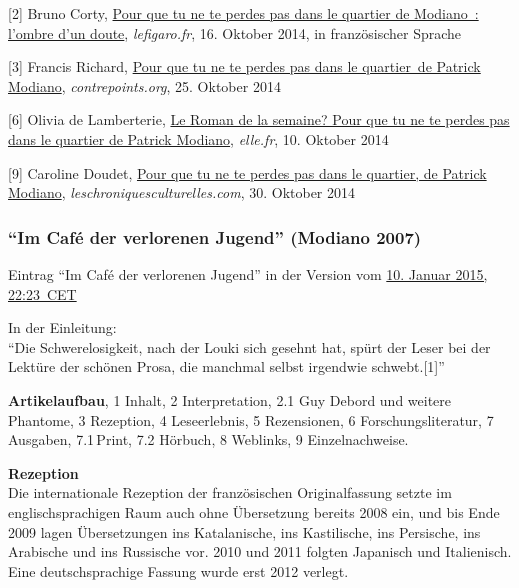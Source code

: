 \documentclass[fontsize=12pt]{scrartcl}
\begin{document}
{\tiny[2] Bruno Corty, \href{http://www.lefigaro.fr/livres/2014/10/16/03005-20141016ARTFIG00019--pour-que-tu-ne-te-perdes-pas-dans-le-quartier-de-modiano-l-ombre-d-un-doute.php}{Pour que tu ne te perdes pas dans le quartier de Modiano : l'ombre d'un doute}, \textit{lefigaro.fr}, 16. Oktober 2014, in franz\"osischer Sprache\par}
{\tiny[3] Francis Richard, \href{http://www.contrepoints.org/2014/10/25/185863-pour-que-tu-ne-te-perdes-pas-dans-le-quartier-de-patrick-modiano}{\flq Pour que tu ne te perdes pas dans le quartier\frq\, de Patrick Modiano}, \textit{contrepoints.org}, 25. Oktober 2014\par}
{\tiny[6] Olivia de Lamberterie, \href{http://www.elle.fr/Loisirs/Livres/News/Le-roman-de-la-semaine-Pour-que-tu-ne-te-perdes-pas-dans-le-quartier-de-Patrick-Modiano-2846552}{Le Roman de la semaine? \flq Pour que tu ne te perdes pas dans le quartier\frq\,\,de Patrick Modiano}, \textit{elle.fr}, 10. Oktober 2014\par}
{\tiny[9] Caroline Doudet, \href{http://leschroniquesculturelles.com/2014/10/30/pour-que-tu-ne-me-perdes-pas-dans-le-quartier-de-patrick-modiano/}{Pour que tu ne te perdes pas dans le quartier, de Patrick Modiano}, \textit{leschroniquesculturelles.com}, 30. Oktober 2014\par}

\subsubsection{"`Im Caf\'{e} der verlorenen Jugend"' (Modiano 2007)}
\label{subsubsec:6.1.3}

Eintrag "`Im Caf\'{e} der verlorenen Jugend"' in der Version vom \href{https://de.wikipedia.org/w/index.php?title=Im_Caf\%C3\%A9_der_verlorenen_Jugend&oldid=137646716}{10. Januar 2015, \mbox{22:23 CET}}

In der Einleitung:\\ "`Die Schwerelosigkeit, nach der Louki sich gesehnt hat, sp\"urt der Leser bei der Lekt\"ure der sch\"onen Prosa, die manchmal \mbox{selbst} \flq irgend\-wie schwebt\frq.[1]"'

\textbf{Artikelaufbau}, 1 Inhalt, 2 Interpretation, 2.1 Guy Debord und weitere Phantome, 3 Rezeption, 4 Leseerlebnis, 5 Rezensionen, 6 For\-schungsli\-te\-ra\-tur, 7 Ausgaben, 7.1\,Print, 7.2 H\"orbuch, 8 Weblinks, 9 Einzelnachweise.

\textbf{Rezeption}\\
Die internationale Rezeption der franz\"osischen Originalfassung setzte im eng\-lisch\-spra\-chigen Raum auch ohne \"Ubersetzung bereits 2008 ein, und bis Ende 2009 lagen \"Uber\-set\-zun\-gen ins Katalanische, ins Kastilische, ins Persische, ins Arabische und ins Russische vor. 2010 und 2011 folgten Japanisch und Italienisch. Eine deutschspra\-chi\-ge Fassung wurde erst 2012 verlegt.
\end{document}
